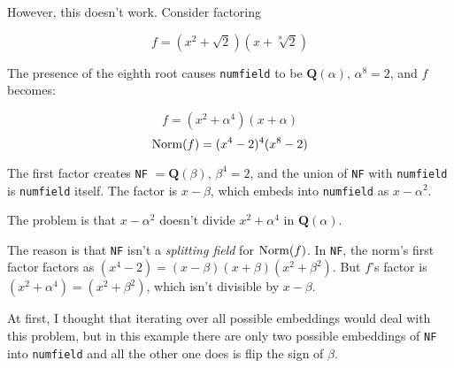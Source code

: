 \documentclass{article}
\newcommand{\Bold}[1]{\mathbf{#1}}
\newcommand{\QQ}{\Bold{Q}}
\newcommand{\Norm}{{\rm Norm}}
\begin{document}
However, this doesn't work.  Consider factoring

$$f = (x^2+\sqrt{2})(x+\sqrt[8]{2})$$

The presence of the eighth root causes {\tt numfield} to be
$\QQ(\alpha)$, $\alpha^8=2$, and $f$ becomes:

$$f = (x^2+\alpha^4)(x+\alpha)$$
$$\Norm(f) = (x^4-2)^4(x^8-2)$$

The first factor creates
{\tt NF} $=\QQ(\beta)$, $\beta^4=2$, and the union of {\tt NF}
with {\tt numfield} is {\tt numfield} itself.  The factor is $x-\beta$,
which embeds into {\tt numfield} as $x-\alpha^2$.

The problem is that $x-\alpha^2$ doesn't divide $x^2+\alpha^4$
in $\QQ(\alpha)$.

The reason is that {\tt NF} isn't a {\it splitting field}
for $\Norm(f)$.
In {\tt NF}, the norm's first factor factors as
$(x^4-2) = (x-\beta)(x+\beta)(x^2+\beta^2)$.  But $f$'s
factor is $(x^2+\alpha^4) = (x^2+\beta^2)$, which
isn't divisible by $x-\beta$.

At first, I thought that iterating over all possible embeddings
would deal with this problem, but in this example there
are only two possible embeddings of {\tt NF} into {\tt numfield}
and all the other one does is flip the sign of $\beta$.

\begin{comment}
\begin{verbatim}
numfield_f = f.map_coefficients(elem_dict.__getitem__, new_base_ring=numfield)

def NF_elem_map(e):
    return NF(e.numerator()) / NF(e.denominator())

factor_NF = factor.map_coefficients(NF_elem_map, new_base_ring=NF)

homs = numfield.embeddings(NF)

if len(homs) > 0:

    for numfield_into_NF in homs:

        numfield_NF = numfield_f.map_coefficients(numfield_into_NF)

        for i in itertools.count(1):
            if numfield_NF % (factor_NF)**i != 0:
                multiplicity = i-1
                break

        if multiplicity > 0:
            for hom in NF.embeddings(QQbar):
                if hom * numfield_into_NF == morphism:
                    QQbar_factor = factor_NF.map_coefficients(hom)
                    factorization.append((QQbar_factor, multiplicity))

else:

    assert multiplicity % numfield.degree() == 0
    multiplicity = multiplicity // numfield.degree()

    for hom in NF.embeddings(QQbar):
        QQbar_factor = factor_NF.map_coefficients(hom)
        factorization.append((QQbar_factor, multiplicity))
\end{verbatim}
\end{comment}
\end{document}
